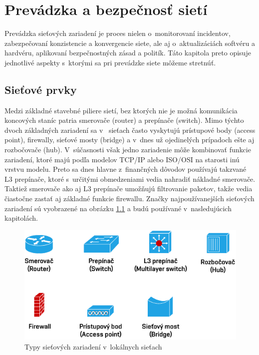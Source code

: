 \chapter{Prevádzka a bezpečnosť sietí}
Prevádzka sieťových zariadení je proces nielen o~monitorovaní incidentov, zabezpečovaní konzistencie a konvergencie siete, ale aj o~aktualizáciách softvéru a hardvéru, aplikovaní bezpečnostných zásad a politík. Táto kapitola preto opisuje jednotlivé aspekty s~ktorými sa pri prevádzke siete môžeme stretnúť.

\section{Sieťové prvky}

Medzi základné stavebné piliere sietí, bez ktorých nie je možná komunikácia koncových staníc patria smerovače (router) a prepínače (switch). Mimo týchto dvoch základných zariadení sa v~ sieťach často vyskytujú prístupové body (access point), firewally, sieťové mosty (bridge) a v~dnes už ojedinelých prípadoch ešte aj rozbočovače (hub). V~súčasnosti však jedno zariadenie môže kombinovať funkcie zariadení, ktoré majú podľa modelov TCP/IP alebo ISO/OSI na starosti inú vrstvu modelu. Preto sa dnes hlavne z~finančných dôvodov používajú takzvané L3 prepínače, ktoré s~určitými obmedzeniami vedia nahradiť nákladné smerovače. Taktiež smerovače ako aj L3 prepínače umožňujú filtrovanie paketov, takže vedia čiastočne zastať aj základné funkcie firewallu. Značky najpoužívanejších sieťových zariadení sú vyobrazené na obrázku \ref{fig:net-devices} a budú používané v~nasledujúcich kapitolách.

\begin{figure}[H]
	\begin{center}
		\includegraphics[scale=1.2]{obrazky/net_devices.pdf}
	\end{center}
	\caption[Typy sieťových zariadení v~lokálnych sieťach]{Typy sieťových zariadení v~lokálnych sieťach}
	\label{fig:net-devices}
\end{figure} 

